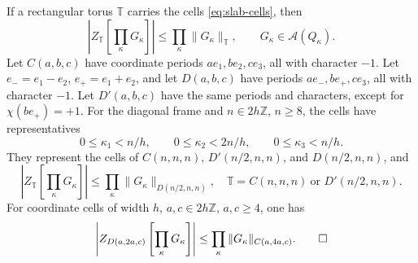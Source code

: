 \documentclass[11pt,letterpaper,reqno]{amsart}
\newcommand{\Z}{\mathbb Z}
\begin{document}
\begin{proposition}\label{thm:slab-chessboard}
If a rectangular torus $\mathbb T$ carries the cells
\eqref{eq:slab-cells}, then
\begin{equation}\label{eq:slab-chessboard-rectangular}
 \left|Z_{\mathbb T}\left[\prod_{\kappa}G_\kappa\right]\right|
                       \le\prod_\kappa\|G_\kappa\|_{\mathbb T},
 \qquad G_\kappa\in\mathcal A(Q_\kappa).
\end{equation}
Let $C(a,b,c)$ have coordinate periods $ae_1,be_2,ce_3$,
all with character $-1$.
Let $e_-=e_1-e_2$, $e_+=e_1+e_2$, and let $D(a,b,c)$ have periods
$ae_-,be_+,ce_3$, all with character $-1$. Let $D'(a,b,c)$ have the
same periods and characters, except for $\chi(be_+)=+1$.
For the diagonal frame and $n\in2h\Z$, $n\ge8$, the cells have
representatives
\[
 0\le\kappa_1<n/h,\qquad 0\le\kappa_2<2n/h,
                     \qquad0\le\kappa_3<n/h.
\]
They represent the cells of $C(n,n,n)$, $D'(n/2,n,n)$, and
$D(n/2,n,n)$, and
\begin{equation}\label{eq:slab-chessboard-diagonal}
 \left|Z_{\mathbb T}\left[\prod_\kappa G_\kappa\right]\right|
           \le\prod_\kappa\|G_\kappa\|_{D(n/2,n,n)},
 \quad \mathbb T=C(n,n,n)\ \text{or }D'(n/2,n,n).
\end{equation}
For coordinate cells of width $h$, $a,c\in2h\Z$, $a,c\ge4$, one has
\begin{equation}\label{eq:slab-chessboard-coordinate}
 \left|Z_{D(a,2a,c)}\left[\prod_\kappa G_\kappa\right]\right|
                \le\prod_\kappa\|G_\kappa\|_{C(a,4a,c)}.\qedhere
\end{equation}
\end{proposition}
\end{document}
